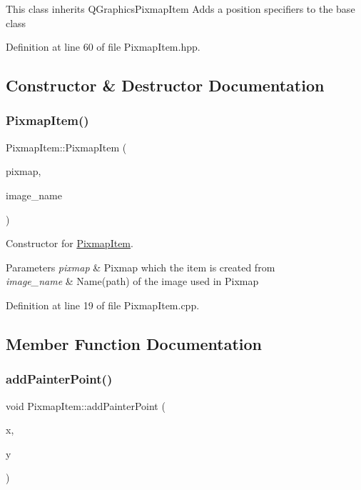 This class inherits Q\+Graphics\+Pixmap\+Item Adds a position specifiers to the base class 

Definition at line 60 of file Pixmap\+Item.\+hpp.



\subsection{Constructor \& Destructor Documentation}
\mbox{\label{classPixmapItem_a7e339e581be3c4892d2af89494bd137c}} 
\subsubsection{\texorpdfstring{Pixmap\+Item()}{PixmapItem()}}
{\footnotesize\ttfamily Pixmap\+Item\+::\+Pixmap\+Item (\begin{DoxyParamCaption}\item[{Q\+Pixmap}]{pixmap,  }\item[{Q\+String}]{image\+\_\+name }\end{DoxyParamCaption})}



Constructor for \mbox{\hyperlink{classPixmapItem}{Pixmap\+Item}}. 


\begin{DoxyParams}{Parameters}
{\em pixmap} & Pixmap which the item is created from \\
\hline
{\em image\+\_\+name} & Name(path) of the image used in Pixmap \\
\hline
\end{DoxyParams}


Definition at line 19 of file Pixmap\+Item.\+cpp.



\subsection{Member Function Documentation}
\mbox{\label{classPixmapItem_a6e18b1223f61d40dba6e96f4da15ce5c}} 
\subsubsection{\texorpdfstring{add\+Painter\+Point()}{addPainterPoint()}}
{\footnotesize\ttfamily void Pixmap\+Item\+::add\+Painter\+Point (\begin{DoxyParamCaption}\item[{unsigned}]{x,  }\item[{unsigned}]{y }\end{DoxyParamCaption})}



